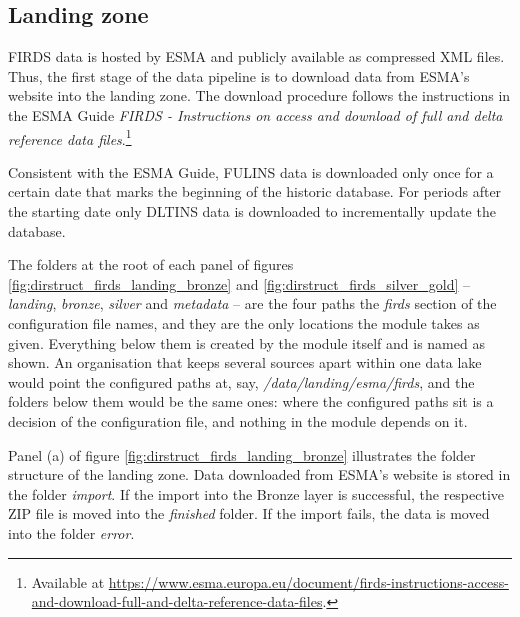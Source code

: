 \subsection{Landing zone}

FIRDS data is hosted by ESMA and publicly available as compressed XML files. Thus, the first stage of the data pipeline is to download data from ESMA's website into the landing zone. The download procedure follows the instructions in the ESMA Guide \emph{FIRDS - Instructions on access and download of full and delta reference data files}.\footnote{Available at \url{https://www.esma.europa.eu/document/firds-instructions-access-and-download-full-and-delta-reference-data-files}.}

Consistent with the ESMA Guide, FULINS data is downloaded only once for a certain date that marks the beginning of the historic database. For periods after the starting date only DLTINS data is downloaded to incrementally update the database.

The folders at the root of each panel of figures \ref{fig:dirstruct_firds_landing_bronze} and \ref{fig:dirstruct_firds_silver_gold} -- \emph{landing}, \emph{bronze}, \emph{silver} and \emph{metadata} -- are the four paths the \emph{firds} section of the configuration file names, and they are the only locations the module takes as given. Everything below them is created by the module itself and is named as shown. An organisation that keeps several sources apart within one data lake would point the configured paths at, say, \emph{/data/landing/esma/firds}, and the folders below them would be the same ones: where the configured paths sit is a decision of the configuration file, and nothing in the module depends on it.

Panel (a) of figure \ref{fig:dirstruct_firds_landing_bronze} illustrates the folder structure of the landing zone. Data downloaded from ESMA's website is stored in the folder \emph{import}. If the import into the Bronze layer is successful, the respective ZIP file is moved into the \emph{finished} folder. If the import fails, the data is moved into the folder \emph{error}.

